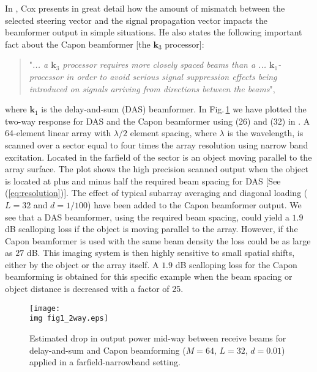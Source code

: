 \documentclass[draftcls]{IEEEtran}
\newcommand{\mat}[1]{\mathbf{#1}}
\renewcommand{\vec}[1]{\mathbf{#1}}
\newcommand{\img}{img/}
\begin{document}
In \cite{Cox1973}, Cox presents in great detail how the amount of mismatch between the selected steering vector and the signal propagation vector impacts the beamformer output in simple situations. He also states the following important fact about the Capon beamformer [the $\vec{k}_3$ processor]: 
\begin{quote}
"\textit{... a $\vec{k}_3$ processor requires more closely spaced beams than a ... $\vec{k}_1$-processor in order to avoid serious signal suppression effects being introduced on signals arriving from directions between the beams}", 
\end{quote}
where $\vec{k}_1$ is the delay-and-sum (DAS) beamformer. In Fig.\,\ref{fig:das_capon_beams} we have plotted the two-way response for DAS and the Capon beamformer using (26) and (32) in \cite{Cox1973}. A 64-element linear array with $\lambda/2$ element spacing, where $\lambda$ is the wavelength, is scanned over a sector equal to four times the array resolution using narrow band excitation. Located in the farfield of the sector is an object moving parallel to the array surface. The plot shows the high precision scanned output when the object is located at plus and minus half the required beam spacing for DAS [See (\ref{eq:resolution})]. %
The effect of typical subarray averaging and diagonal loading ($L=32$ and $d=1/100$) have been added to the Capon beamformer output. We see that a DAS beamformer, using the required beam spacing, could yield a $1.9$ dB scalloping loss \cite{Harris1978} if the object is moving parallel to the array. However, if the Capon beamformer is used with the same beam density the loss could be as large as $27$ dB. This imaging system is then highly sensitive to small spatial shifts, either by the object or the array itself. A $1.9$ dB scalloping loss for the Capon beamforming is obtained for this specific example when the beam spacing or object distance is decreased with a factor of 25. 

\begin{figure}[!t]
\centerline{
\texttt{[image: \\img fig1\_2way.eps]}
}
\caption{Estimated drop in output power mid-way between receive beams for delay-and-sum and Capon beamforming ($M=64$, $L=32$, $d=0.01$) applied in a farfield-narrowband setting. %
}
\label{fig:das_capon_beams}
\end{figure}
\end{document}
